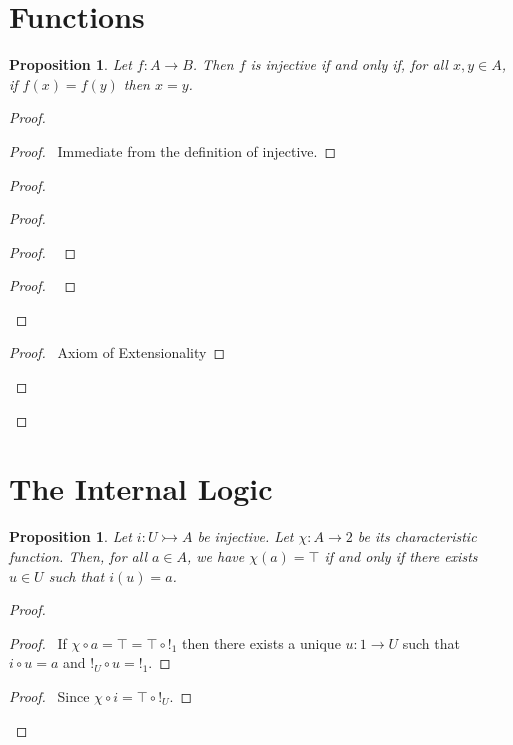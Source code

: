 \documentclass{book}
\let\qed\relax
\newtheorem{prop}[ax]{Proposition}
\theoremstyle{definition}
\begin{document}

\section{Functions}

\begin{prop}
Let $f : A \rightarrow B$. Then $f$ is injective if and only if, for all $x, y \in A$, if $f(x) = f(y)$ then $x = y$.
\end{prop}

\begin{proof}
\pf
{}
\begin{proof}
	\pf\ Immediate from the definition of injective.
\end{proof}
\begin{proof}
	\begin{proof}
		\begin{proof}
			\pf\ 
		\end{proof}
		\begin{proof}
			\pf\ 
		\end{proof}
	\end{proof}
	\begin{proof}
		\pf\ Axiom of Extensionality
	\end{proof}
\end{proof}
\qed
\end{proof}

\section{The Internal Logic}

\begin{prop}
\label{prop:charfun}
Let $i : U \rightarrowtail A$ be injective. Let $\chi : A \rightarrow 2$ be its characteristic function. Then, for all $a \in A$, we have $\chi(a) = \top$ if and only if there exists $u \in U$ such that $i(u) = a$.
\end{prop}

\begin{proof}
\pf
{}
\begin{proof}
	\pf\ If $\chi \circ a = \top = \top \circ !_1$ then there exists a unique $u : 1 \rightarrow U$ such that $i \circ u = a$ and $!_U \circ u = !_1$.
\end{proof}
\begin{proof}
	\pf\ Since $\chi \circ i = \top \circ !_U$.
\end{proof}
\qed
\end{proof}
\end{document}

